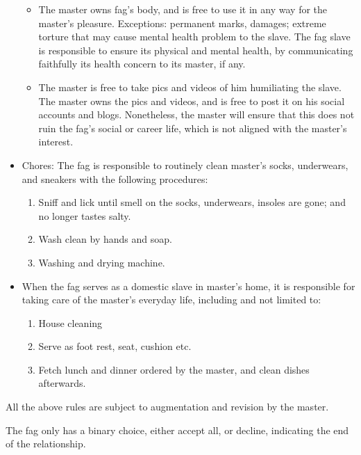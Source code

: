 \documentclass[a4paper,fontset=ubuntu,12pt]{ctexart}
\begin{document}
\begin{itemize}
\begin{itemize}
            \item The master owns fag's body, and is free to use it in any way for the master's pleasure. Exceptions: permanent marks, damages; extreme torture that may cause mental health problem to the slave. The fag slave is responsible to ensure its physical and mental health, by communicating faithfully its health concern to its master, if any.
            
            \item The master is free to take pics and videos of him humiliating the slave. The master owns the pics and videos, and is free to post it on his social accounts and blogs. Nonetheless, the master will ensure that this does not ruin the fag's social or career life, which is not aligned with the master's interest.
            
        \end{itemize}
    
    \item Chores: The fag is responsible to routinely clean master's socks, underwears, and sneakers with the following procedures:
        \begin{enumerate}
            \item Sniff and lick until smell on the socks, underwears, insoles are gone; and no longer tastes salty.
            \item Wash clean by hands and soap.
            \item Washing and drying machine.
        \end{enumerate}
        
    \item When the fag serves as a domestic slave in master's home, it is responsible for taking care of the master's everyday life, including and not limited to:
        \begin{enumerate}
            \item House cleaning
            \item Serve as foot rest, seat, cushion etc.
            \item Fetch lunch and dinner ordered by the master, and clean dishes afterwards.
        \end{enumerate}

\end{itemize}        

All the above rules are subject to augmentation and revision by the master.

The fag only has a binary choice, either accept all, or decline, indicating the end of the relationship.
\end{document}
